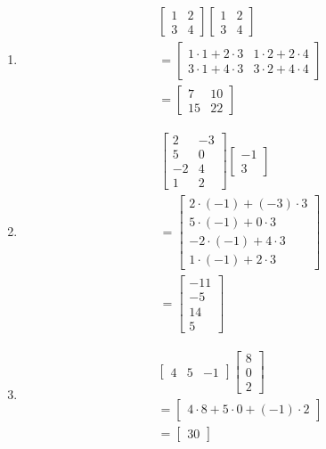 \documentclass[
  letterpaper,
  DIV=11,
  numbers=noendperiod]{scrartcl}
\begin{document}
\begin{enumerate}
\def\labelenumi{\arabic{enumi}.}
\item
  \begin{align*}
  &\begin{bmatrix} 1 & 2 \\ 3 & 4\end{bmatrix}\begin{bmatrix} 1 & 2 \\ 3 & 4 \end{bmatrix} \\
  &= \begin{bmatrix} 1 \cdot 1 + 2 \cdot 3 & 1 \cdot 2 + 2 \cdot 4 \\ 3 \cdot 1 + 4 \cdot 3 & 3 \cdot 2 + 4 \cdot 4 \end{bmatrix} \\
  &= \begin{bmatrix} 7 & 10 \\ 15 & 22 \end{bmatrix}
  \end{align*}
\item
  \begin{align*}
  &\begin{bmatrix}2 & -3 \\ 5 & 0 \\ -2 & 4 \\ 1 & 2 \end{bmatrix}\begin{bmatrix}-1 \\ 3 \end{bmatrix} \\
  &=\begin{bmatrix} 2 \cdot (-1) + (-3) \cdot 3 \\ 5 \cdot (-1) + 0 \cdot 3 \\ -2 \cdot (-1) + 4 \cdot 3 \\ 1 \cdot (-1) + 2 \cdot 3 \end{bmatrix} \\
  &=\begin{bmatrix} -11 \\ -5 \\ 14 \\ 5 \end{bmatrix}
  \end{align*}
\item
  \begin{align*}
  &\begin{bmatrix}4 & 5 & -1 \end{bmatrix}\begin{bmatrix} 8 \\ 0 \\ 2\end{bmatrix} \\
  &= \begin{bmatrix} 4 \cdot 8 + 5 \cdot 0 + (-1) \cdot 2 \end{bmatrix} \\
  &= \begin{bmatrix} 30 \end{bmatrix}
  \end{align*}
\end{enumerate}
\end{document}
